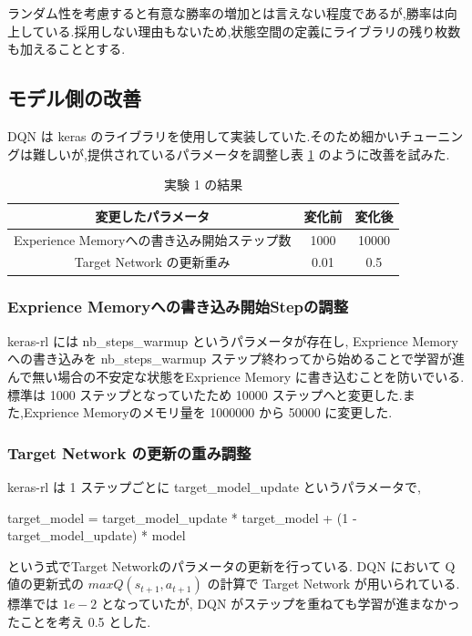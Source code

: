 \documentclass{jarticle}     %
\begin{document}
ランダム性を考慮すると有意な勝率の増加とは言えない程度であるが,勝率は向上している.採用しない理由もないため,状態空間の定義にライブラリの残り枚数も加えることとする.

\subsection{モデル側の改善}
DQN は keras のライブラリを使用して実装していた.そのため細かいチューニングは難しいが,提供されているパラメータを調整し表 \ref{table:modelpram} のように改善を試みた\cite{DQNparam}.

\begin{table}[H]
  \centering
  \caption{実験 1 の結果}
  \label{table:modelpram}
  \begin{tabular}{|c|c|c|}
  \hline
  変更したパラメータ                      & 変化前  & 変化後   \\ \hline
  Experience Memoryへの書き込み開始ステップ数 & 1000 & 10000 \\ \hline
  Target Network の更新重み           & 0.01 & 0.5   \\ \hline
  \end{tabular}
  \end{table}

\subsubsection{Exprience Memoryへの書き込み開始Stepの調整}
keras-rl には nb\_steps\_warmup というパラメータが存在し, Exprience Memory への書き込みを nb\_steps\_warmup ステップ終わってから始めることで学習が進んで無い場合の不安定な状態をExprience Memory に書き込むことを防いでいる. 標準は 1000 ステップとなっていたため 10000 ステップへと変更した.また,Exprience Memoryのメモリ量を 1000000 から 50000 に変更した.

\subsubsection{Target Network の更新の重み調整}
keras-rl は 1 ステップごとに target\_model\_update というパラメータで, \par
target\_model = target\_model\_update * target\_model + (1 - target\_model\_update) * model
\par
という式でTarget Networkのパラメータの更新を行っている.
 DQN において Q 値の更新式の $maxQ(s_{t+1},a_{t+1})$ の計算で Target Network が用いられている\cite{targetnetwork}.標準では $1e-2$ となっていたが, DQN がステップを重ねても学習が進まなかったことを考え 0.5 とした.
\end{document}
